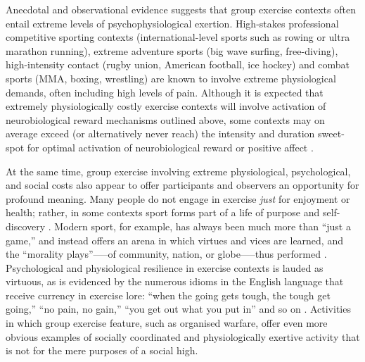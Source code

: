 \begin{CJK}{UTF8}{gbsn}

Anecdotal and observational evidence suggests that group exercise contexts often entail extreme levels of psychophysiological exertion.  High-stakes professional competitive sporting contexts (international-level sports such as rowing or ultra marathon running), extreme adventure sports (big wave surfing, free-diving), high-intensity contact (rugby union, American football, ice hockey) and combat sports (MMA, boxing, wrestling) are known to involve extreme physiological demands, often including high levels of pain.  Although it is expected that extremely physiologically costly exercise contexts will involve activation of neurobiological reward mechanisms outlined above, some contexts may on average exceed (or alternatively never reach) the intensity and duration sweet-spot for optimal activation of neurobiological reward \citep{Raichlen2013} or positive affect \citep[see Appendix~\ref{sect:neuroRewardGE} for more details on exercise-specific neuropharmacological effects)]{Ekkekakis2011,Reed2006}.

At the same time, group exercise involving extreme physiological, psychological, and social costs also appear to offer participants and observers an opportunity for profound meaning.  Many people do not engage in exercise \textit{just} for enjoyment or health; rather, in some contexts sport forms part of a life of purpose and self-discovery \citep[see, for example][]{Jackson1995,Jones2004,White2011}.  Modern sport, for example, has always been much more than ``just a game,'' and instead offers an arena in which virtues and vices are learned, and the ``morality plays''—--of community, nation, or globe—--thus performed \citep{Elias1986,McNamee2008}.  Psychological and physiological resilience in exercise contexts is lauded as virtuous, as is evidenced by the numerous idioms in the English language that receive currency in exercise lore: ``when the going gets tough, the tough get going,'' ``no pain, no gain,'' ``you get out what you put in'' and so on \citep{Sarkar2014}.  Activities in which group exercise feature, such as organised warfare, offer even more obvious examples of socially coordinated and physiologically exertive activity that is not for the mere purposes of a social high.


\end{CJK}
